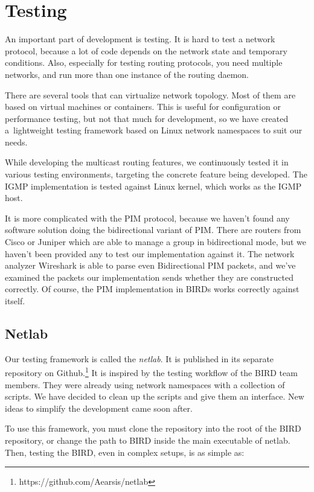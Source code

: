 \chapter{Testing}

An important part of development is testing. It is hard to test a network
protocol, because a lot of code depends on the network state and temporary
conditions. Also, especially for testing routing protocols, you need multiple
networks, and run more than one instance of the routing daemon.

There are several tools that can virtualize network topology. Most of them are
based on virtual machines or containers. This is useful for configuration or
performance testing, but not that much for development, so we have created
a~lightweight testing framework based on Linux network namespaces to suit our
needs.

While developing the multicast routing features, we continuously tested it in
various testing environments, targeting the concrete feature being developed.
The IGMP implementation is tested against Linux kernel, which works as the IGMP
host.

It is more complicated with the PIM protocol, because we haven't
found any software solution doing the bidirectional variant of PIM. There are
routers from Cisco or Juniper which are able to manage a group in bidirectional
mode, but we haven't been provided any to test our implementation against it.
The network analyzer Wireshark is able to parse even Bidirectional PIM packets,
and we've examined the packets our implementation sends whether they are
constructed correctly. Of course, the PIM implementation in BIRDs works
correctly against itself.

\section{Netlab}
Our testing framework is called the \emph{netlab}. It is published in its
separate repository on Github.\footnote{https://github.com/Aearsis/netlab}
It is inspired by the testing workflow of the BIRD team members. They were
already using network namespaces with a collection of scripts. We have decided
to clean up the scripts and give them an interface. New ideas to simplify the
development came soon after.

To use this framework, you must clone the repository into the root of the BIRD
repository, or change the path to BIRD inside the main executable of netlab.
Then, testing the BIRD, even in complex setups, is as simple as:

